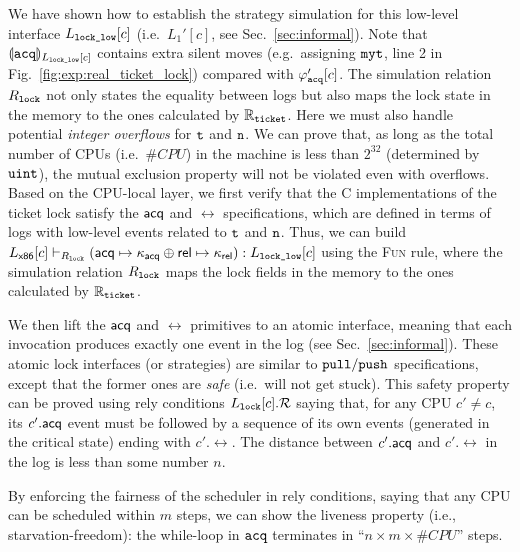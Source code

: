 We have shown how to establish the strategy simulation
for this low-level interface $L_{\mathrm{\texttt{lock\_low}}}[c]$ (i.e.\, $L_1'[c]$, see Sec.~\ref{sec:informal}).
Note that $\llparenthesis {\mathrm{\texttt{acq}}} \rrparenthesis_{L_{\mathrm{\texttt{lock\_low}}}[c]}$ contains extra silent moves (e.g.\, assigning ${\mathrm{\texttt{myt}}}$, line 2 in Fig.~\ref{fig:exp:real_ticket_lock}) compared with $\varphi_{{\mathrm{\texttt{acq}}}}'[c]$.
The simulation relation 
$R_{\mathrm{\texttt{lock}}}$ not only states the equality between logs but also maps the lock
state in the memory to the ones calculated by $\mathbb{R}_{{\mathrm{\texttt{ticket}}}}$.
Here we must also handle potential \emph{integer overflows} for ${\mathrm{\texttt{t}}}$ and ${\mathrm{\texttt{n}}}$.
We can prove that, as long as the total number of CPUs (i.e.\, $\#CPU$) in the machine is less than $2^{32}$ (determined by ${\mathrm{\texttt{uint}}}$), the mutual exclusion property will not be violated  even with overflows. 
Based on the CPU-local layer, we first verify that the C implementations of 
the ticket lock satisfy the $\mathsf{acq}$ and $\rel$ specifications,
which are defined in terms of logs with low-level events
related to ${\mathrm{\texttt{t}}}$ and ${\mathrm{\texttt{n}}}$.
Thus, we can build $L_\mathsf{x86}[c] \vdash_{R_{\mathrm{\texttt{lock}}}} (\mathsf{acq} \mapsto \kappa_{\mathsf{acq}}
\oplus \mathsf{rel} \mapsto \kappa_{\mathsf{rel}}) : L_{\mathrm{\texttt{lock\_low}}}[c]$
using the \textsc{Fun} rule,
where the simulation relation $R_{\mathrm{\texttt{lock}}}$ maps the lock
fields in the memory to the ones calculated by $\mathbb{R}_{{\mathrm{\texttt{ticket}}}}$.

We then lift the $\mathsf{acq}$ and $\rel$ primitives to an atomic interface, meaning that each
invocation produces exactly one event in the log (see Sec.~\ref{sec:informal}).
These atomic lock interfaces (or strategies) are similar to ${\mathrm{\texttt{pull}}}/{\mathrm{\texttt{push}}}$ specifications,
except that the former ones are \emph{safe} (i.e.\, will not get stuck).
This safety property can be proved using rely conditions $L_{\mathrm{\texttt{lock}}}[c].\mathcal{R}$ saying that,
for any CPU $c'\neq c$, its $c'.\mathsf{acq}$ event must be followed by a sequence of its own events (generated in the critical state)
ending with $c'.\rel$. The distance between $c'.\mathsf{acq}$ and $c'.\rel$ in the log is less than some number $n$.

By enforcing the fairness of the scheduler in rely conditions, saying that any CPU can be scheduled
within $m$ steps, we can show the liveness property (i.e., starvation-freedom): the while-loop in ${\mathrm{\texttt{acq}}}$ terminates
in ``$n \times m \times \#CPU$'' steps.


